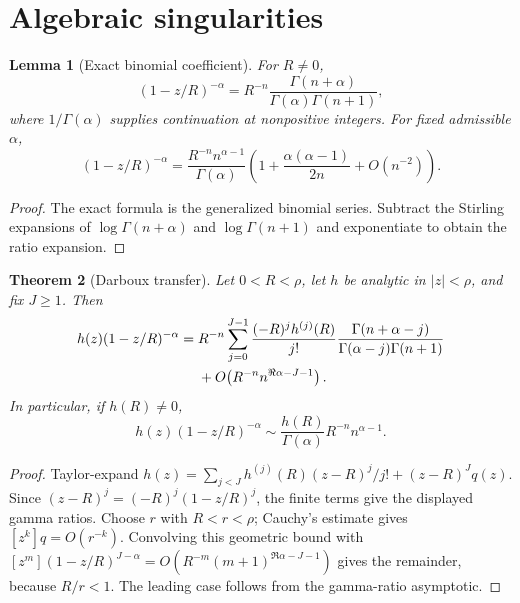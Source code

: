 \documentclass[11pt,a4paper,oneside,openany]{book}
\newtheorem{theorem}{Theorem}[chapter]
\newtheorem{lemma}[theorem]{Lemma}
\theoremstyle{definition}
\theoremstyle{remark}
\begin{document}
\section{Algebraic singularities}

\begin{lemma}[Exact binomial coefficient]
\label{lem:merged-singular-binomial}
For $R\ne0$,
\begin{equation}
 [z^n](1-z/R)^{-\alpha}
 =R^{-n}\frac{\Gamma(n+\alpha)}{\Gamma(\alpha)\Gamma(n+1)},         \label{eq:merged-singular-binomial}
\end{equation}
where $1/\Gamma(\alpha)$ supplies continuation at nonpositive integers.  For
fixed admissible $\alpha$,
\begin{equation}
 [z^n](1-z/R)^{-\alpha}
 =\frac{R^{-n}n^{\alpha-1}}{\Gamma(\alpha)}
 \left(1+\frac{\alpha(\alpha-1)}{2n}+O(n^{-2})\right).              \label{eq:merged-singular-binomial-asymp}
\end{equation}
\end{lemma}

\begin{proof}
The exact formula is the generalized binomial series.  Subtract the Stirling
expansions of $\log\Gamma(n+\alpha)$ and $\log\Gamma(n+1)$ and exponentiate
to obtain the ratio expansion.
\end{proof}

\begin{theorem}[Darboux transfer]
\label{thm:merged-darboux-transfer}
Let $0<R<\rho$, let $h$ be analytic in $|z|<\rho$, and fix $J\geq1$.  Then
\begin{align}
 [z^n]h(z)(1-z/R)^{-\alpha}
={}&R^{-n}\sum_{j=0}^{J-1}\frac{(-R)^jh^{(j)}(R)}{j!}
 \frac{\Gamma(n+\alpha-j)}{\Gamma(\alpha-j)\Gamma(n+1)}            \notag\\
 &+O\!\left(R^{-n}n^{\Re\alpha-J-1}\right).                       \label{eq:merged-darboux-transfer}
\end{align}
In particular, if $h(R)\ne0$,
\begin{equation}
 [z^n]h(z)(1-z/R)^{-\alpha}
 \sim\frac{h(R)}{\Gamma(\alpha)}R^{-n}n^{\alpha-1}.                \label{eq:merged-basic-transfer}
\end{equation}
\end{theorem}

\begin{proof}
Taylor-expand
$h(z)=\sum_{j<J}h^{(j)}(R)(z-R)^j/j!+(z-R)^Jq(z)$.  Since
$(z-R)^j=(-R)^j(1-z/R)^j$, the finite terms give the displayed gamma ratios.
Choose $r$ with $R<r<\rho$; Cauchy's estimate gives $[z^k]q=O(r^{-k})$.
Convolving this geometric bound with
$[z^m](1-z/R)^{J-\alpha}=O(R^{-m}(m+1)^{\Re\alpha-J-1})$ gives the remainder,
because $R/r<1$.  The leading case follows from the gamma-ratio asymptotic.
\end{proof}
\end{document}
